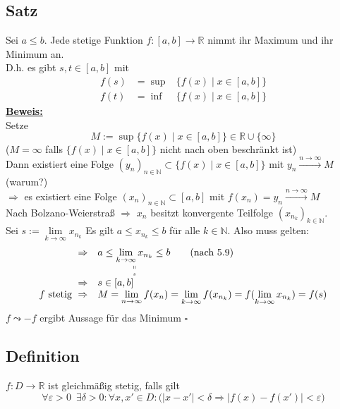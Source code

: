\subsection{Satz} %
\label{sub:satz}
Sei $a \le b$. Jede stetige Funktion $f : [a,b] \to \mathds{R}$ nimmt ihr Maximum und ihr Minimum an. \\
D.h. es gibt $s,t \in [a,b]$ mit
\[
	\begin{array}{cll}
	f(s) &= \sup & \{ f(x) \mid x \in [a,b] \} \\
	f(t) &= \inf & \{ f(x) \mid x \in [a,b] \}
	\end{array}
\] 
\underline{\textbf{Beweis:}} \\
Setze 
\[
	M:= \sup \big\{ f(x) \mid x \in [a,b]\big\} \in \mathds{R} \cup \{ \infty\}
\]
{\small ($M= \infty$ falls $\{f(x) \mid x \in [a,b] \}$ nicht nach oben beschränkt ist)}
\vspace{10pt} \\
Dann existiert eine Folge $(y_n)_{n \in \mathds{N}} \subset \{ f(x) \mid x \in [a,b] \}$ mit $y_n \xrightarrow{n \to \infty} M$
(warum?) \\
$\Rightarrow $ es existiert eine Folge $(x_n)_{n \in \mathds{N}} \subset [a,b]$ mit $f(x_n) = y_n \xrightarrow{n \to \infty} M$ 
\vspace{10pt} \\
Nach Bolzano-Weierstraß $\Rightarrow$ $x_n$ besitzt konvergente Teilfolge $(x_{n_k})_{k \in \mathds{N}}$.  \\
Sei $s:= \lim\limits_{k \to \infty} x_{n_k}$ Es gilt $a \le x_{n_k} \le b$ für alle $k \in \mathds{N}$. Also muss gelten:
\[
	\begin{array}{rl}
	\Rightarrow & a \le \underset{\underset{s}{\shortparallel}}{\lim\limits_{k \to \infty} x_{n_k}} \le b \tag{nach 5.9} \\
	\Rightarrow & s \in [a,b] \\
	f \text{ stetig } \Rightarrow & M= \lim\limits_{n \to \infty} f(x_n) =\lim\limits_{k \to \infty} f(x_{n_k}) 
	= f(\lim\limits_{k \to \infty} x_{n_k}) = f(s)
\end{array}
\]
$f \leadsto -f$ ergibt Aussage für das Minimum \hfill \( \square \)

\subsection{Definition} %
\label{sub:definition}
$f : D \to \mathds{R}$ ist gleichmäßig stetig, falls gilt
\[
	\forall \varepsilon > 0 \enspace \exists \delta >0 : \forall x,x' \in D : \big( |x-x'|< \delta \Rightarrow |f(x)-f(x')| < \varepsilon \big)
\]

